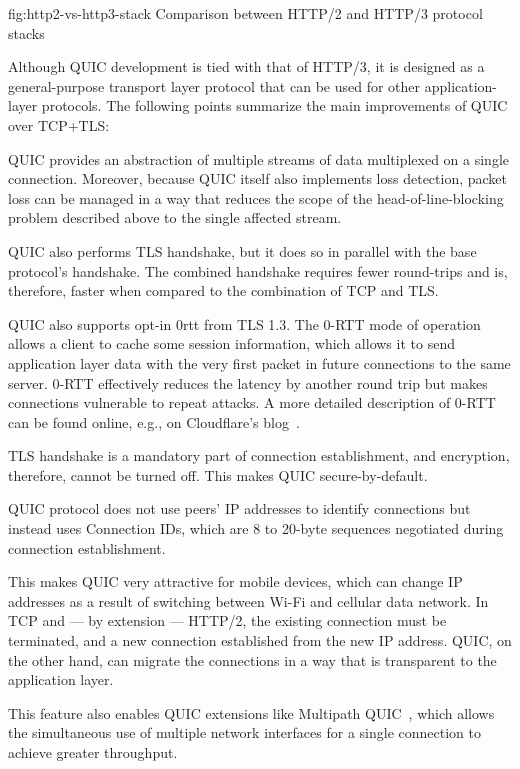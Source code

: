 \begin{myFigure}
  {fig:http2-vs-http3-stack}
  {Comparison between HTTP/2 and HTTP/3 protocol stacks}

  

\end{myFigure}

Although QUIC development is tied with that of HTTP/3, it is designed as a general-purpose transport
layer protocol that can be used for other application-layer protocols. The following points
summarize the main improvements of QUIC over TCP+TLS:

\begin{itemize}

     QUIC provides an abstraction of multiple streams of data multiplexed
    on a single connection. Moreover, because QUIC itself also implements loss detection, packet
    loss can be managed in a way that reduces the scope of the \gls{head-of-line-blocking} problem
    described above to the single affected stream.

     QUIC also performs TLS handshake, but it does so in
    parallel with the base protocol's handshake. The combined handshake requires fewer round-trips
    and is, therefore, faster when compared to the combination of TCP and TLS\@.

    QUIC also supports opt-in \acrfull{0rtt} from TLS 1.3. The 0-RTT mode of operation allows a
    client to cache some session information, which allows it to send application layer data with
    the very first packet in future connections to the same server.  0-RTT effectively reduces the
    latency by another round trip but makes connections vulnerable to repeat attacks. A more detailed
    description of 0-RTT can be found online, e.g., on Cloudflare's blog~\cite{cloudflare-0rtt}.

     TLS handshake is a mandatory part of connection establishment, and
    encryption, therefore, cannot be turned off. This makes QUIC secure-by-default.

     QUIC protocol does not use peers'
    IP addresses to identify connections but instead uses Connection IDs, which are 8 to 20-byte
    sequences negotiated during connection establishment.

    This makes QUIC very attractive for mobile devices, which can change IP addresses as a result of
    switching between Wi-Fi and cellular data network. In TCP and --- by extension --- HTTP/2, the
    existing connection must be terminated, and a new connection established from the new IP
    address. QUIC, on the other hand, can migrate the connections in a way that is transparent to
    the application layer.

    This feature also enables QUIC extensions like Multipath
    QUIC~\cite{draft-deconinck-quic-multipath-04}, which allows the simultaneous use of multiple
    network interfaces for a single connection to achieve greater throughput.

\end{itemize}

